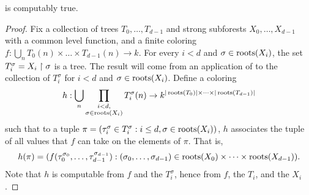 \begin{theorem}\label{lem:hl-forest-computably-true}
   is computably true.
\end{theorem}
\begin{proof}
  Fix a collection of trees $T_0,\dots,T_{d-1}$ and strong subforests $X_0,\dots, X_{d-1}$ with a common level function, and a finite coloring $f:\bigcup_n T_0(n)\times\dots\times T_{d-1}(n)\to k$. For every $i<d$ and $\sigma\in\operatorname{roots}(X_i)$, the set
  $T_i^\sigma = X_i \upharpoonright \sigma$ is a tree. The result will come from an application of  to the collection of $T_i^\sigma$ for $i<d$ and $\sigma\in\operatorname{roots}(X_i)$. Define a coloring  \[h:
      \bigcup_n \prod_{\substack{i<d, \\ \sigma\in \operatorname{roots}(X_i)}}T_i^\sigma(n)\to k^{|\operatorname{roots}(T_0)|\times\dots\times|\operatorname{roots}(T_{d-1})|}
    \]
	such that to a tuple $\pi=(\tau_i^{\sigma} \in T^\sigma_i: i \leq d, \sigma\in \operatorname{roots}(X_i))$, $h$ associates the tuple of all values that $f$ can take on the elements of $\pi$. That is,
    \[
      h(\pi) = ( f(\tau_0^{\sigma_0},\dots,\tau_{d-1}^{\sigma_{d-1}}):  (\sigma_0, \dots, \sigma_{d-1}) \in \operatorname{roots}(X_0) \times \dots \times \operatorname{roots}(X_{d-1}) ).
    \]
	Note that $h$ is computable from $f$ and the $T_i^\sigma$, hence from $f$, the $T_i$, and the $X_i$.


\end{proof}
